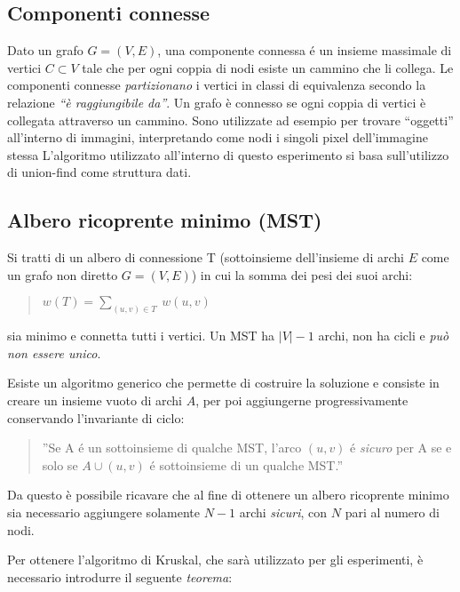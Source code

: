 \documentclass[
]{article}
\begin{document}
\hypertarget{componenti-connesse}{%
\subsection{Componenti connesse}\label{componenti-connesse}}

Dato un grafo \(G=(V,E)\), una componente connessa é un insieme
massimale di vertici \(C\subset V\) tale che per ogni coppia di nodi esiste un
cammino che li collega. Le componenti connesse \emph{partizionano} i
vertici in classi di equivalenza secondo la relazione \emph{``è
raggiungibile da''}. Un grafo è connesso se ogni coppia di vertici è
collegata attraverso un cammino. Sono utilizzate ad esempio per trovare
``oggetti'' all'interno di immagini, interpretando come nodi i singoli
pixel dell'immagine stessa L'algoritmo utilizzato all'interno di questo
esperimento si basa sull'utilizzo di union-find come struttura dati.

\hypertarget{albero-ricoprente-minimo-mst}{%
\subsection{Albero ricoprente minimo
(MST)}\label{albero-ricoprente-minimo-mst}}

Si tratti di un albero di connessione T (sottoinsieme dell'insieme di
archi \(E\) come un grafo non diretto \(G=(V,E)\)) in cui la somma dei
pesi dei suoi archi:

\begin{quote}
\(w(T) = \sum_{(u,v) \in T} \ w(u, v)\)
\end{quote}

sia minimo e connetta tutti i vertici. Un MST ha \(|V|-1\) archi, non ha
cicli e \emph{può non essere unico}.

Esiste un algoritmo generico che permette di costruire la soluzione e
consiste in creare un insieme vuoto di archi \(A\), per poi aggiungerne
progressivamente conservando l'invariante di ciclo:

\begin{quote}
''Se A é un sottoinsieme di qualche MST, l'arco \((u,v)\) é
\emph{sicuro} per A se e solo se \(A \cup (u,v)\) é sottoinsieme di un
qualche MST.''
\end{quote}

Da questo è possibile ricavare che al fine di ottenere un albero
ricoprente minimo sia necessario aggiungere solamente \(N-1\) archi
\emph{sicuri}, con \(N\) pari al numero di nodi.

Per ottenere l'algoritmo di Kruskal, che sarà utilizzato per gli
esperimenti, è necessario introdurre il seguente \emph{teorema}:
\end{document}

